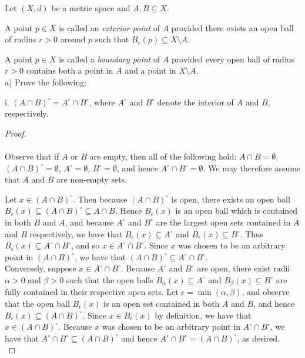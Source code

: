 Let $(X, d)$ be a metric space and $A, B \subseteq X$. 

A point $p \in X$ is called an \emph{exterior point} of $A$ provided there exists an open ball of radius $r > 0$ around
$p$ such that $B_r(p) \subseteq X \setminus A$.

A point $p \in X$ is called a \emph{boundary point} of $A$ provided every open ball of radius $r > 0$ contains both
a point in $A$ and a point in $X \setminus A$. \\

a) Prove the following:

i.  $(A \cap B)^{\circ} = A^{\circ} \cap B^{\circ}$, where $A^{\circ}$ and $B^{\circ}$ denote the interior of $A$ and 
    $B$, respectively. \ \\

\begin{proof}\ \\\\
    Observe that if $A$ or $B$ are empty, then all of the following hold: $A \cap B = \emptyset$, 
    $(A \cap B)^\circ = \emptyset$, $A^{\circ} = \emptyset$, $B^{\circ} = \emptyset$, and hence 
    $A^{\circ} \cap B^{\circ} = \emptyset$. We may therefore assume that $A$ and $B$ are non-empty sets.

    Let $x \in (A \cap B)^{\circ}$. Then because $(A \cap B)^{\circ}$ is open, there exists an open ball 
    $B_\epsilon(x) \subseteq (A \cap B)^{\circ} \subseteq A \cap B$. Hence $B_\epsilon(x)$ is an open ball which is 
    contained in both $B$ and $A$, and because $A^\circ$ and $B^\circ$ are the largest open sets contained in $A$ and 
    $B$ respectively, we have that $B_\epsilon(x) \subseteq A^\circ$ and $B_\epsilon(x) \subseteq B^\circ$. Thus 
    $B_\epsilon(x) \subseteq A^\circ \cap B^\circ$, and so $x \in A^\circ \cap B^\circ$. Since $x$ was chosen to be
    an arbitrary point in $(A \cap B)^{\circ}$, we have that $(A \cap B)^{\circ} \subseteq A^\circ \cap B^\circ$. \\

    Conversely, suppose $x \in A^\circ \cap B^\circ$. Because $A^\circ$ and $B^\circ$ are open, there exist radii 
    $\alpha > 0$ and $\beta > 0$ such that the open balls $B_\alpha(x) \subseteq A^\circ$ and 
    $B_\beta(x) \subseteq B^\circ$ are fully contained in their respective open sets. Let 
    $\epsilon = \min{(\alpha, \beta)}$, and observe that the open ball $B_\epsilon(x)$ is an open set contained in both
    $A$ and $B$, and hence $B_\epsilon(x) \subseteq (A \cap B)^\circ$. Since $x \in B_\epsilon(x)$ by definition, we
    have that $x \in (A \cap B)^\circ$. Because $x$ was chosen to be an arbitrary point in $A^\circ \cap B^\circ$, we
    have that $A^\circ \cap B^\circ \subseteq (A \cap B)^\circ$ and hence 
    $A^\circ \cap B^\circ = (A \cap B)^\circ$, as desired.
    \ \\
\end{proof}

